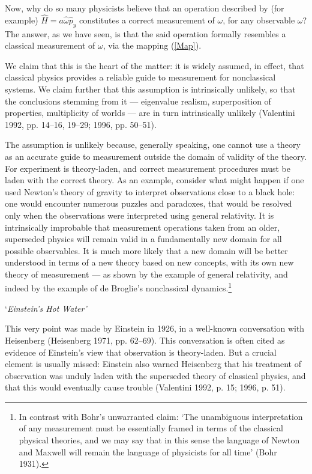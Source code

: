 \documentclass[12pt]{article}%
\begin{document}
Now, why do so many physicists believe that an operation described by (for
example) $\hat{H}=a\hat{\omega}\hat{p}_{y}$ constitutes a correct measurement
of $\omega$, for any observable $\omega$? The answer, as we have seen, is that
the said operation formally resembles a classical measurement of $\omega$, via
the mapping (\ref{Map}).

We claim that this is the heart of the matter: it is widely assumed, in
effect, that classical physics provides a reliable guide to measurement for
nonclassical systems. We claim further that this assumption is intrinsically
unlikely, so that the conclusions stemming from it --- eigenvalue realism,
superposition of properties, multiplicity of worlds --- are in turn
intrinsically unlikely (Valentini 1992, pp. 14--16, 19--29; 1996, pp. 50--51).

The assumption is unlikely because, generally speaking, one cannot use a
theory as an accurate guide to measurement outside the domain of validity of
the theory. For experiment is theory-laden, and correct measurement procedures
must be laden with the correct theory. As an example, consider what might
happen if one used Newton's theory of gravity to interpret observations close
to a black hole: one would encounter numerous puzzles and paradoxes, that
would be resolved only when the observations were interpreted using general
relativity. It is intrinsically improbable that measurement operations taken
from an older, superseded physics will remain valid in a fundamentally new
domain for all possible observables. It is much more likely that a new domain
will be better understood in terms of a new theory based on new concepts, with
its own new theory of measurement --- as shown by the example of general
relativity, and indeed by the example of de Broglie's nonclassical
dynamics.\footnote{In contrast with Bohr's unwarranted claim: `The unambiguous
interpretation of any measurement must be essentially framed in terms of the
classical physical theories, and we may say that in this sense the language of
Newton and Maxwell will remain the language of physicists for all time' (Bohr
1931).}

\begin{center}
`\textit{Einstein's Hot Water'}
\end{center}

This very point was made by Einstein in 1926, in a well-known conversation
with Heisenberg (Heisenberg 1971, pp. 62--69). This conversation is often
cited as evidence of Einstein's view that observation is theory-laden. But a
crucial element is usually missed: Einstein also warned Heisenberg that his
treatment of observation was unduly laden with the superseded theory of
classical physics, and that this would eventually cause trouble (Valentini
1992, p. 15; 1996, p. 51).
\end{document}
